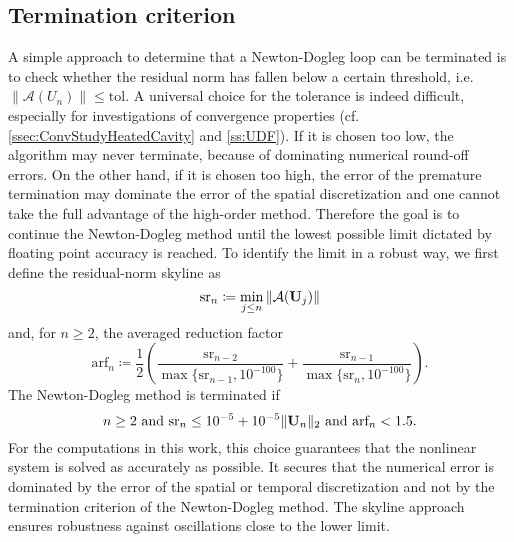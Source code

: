 \subsection{Termination criterion}
\label{ssec:TerminationCriterion}
A simple approach to determine that a Newton-Dogleg loop can be terminated
is to check whether the residual norm has fallen below a certain threshold, i.e.
$ \| \mathcal{A}(U_n) \| \leq \textrm{tol}  $.
A universal choice for the tolerance is indeed difficult,
especially for investigations of convergence properties (cf.  \cref{ssec:ConvStudyHeatedCavity} and \cref{ss:UDF}).
If it is chosen too low, the algorithm may never terminate, because of dominating numerical round-off errors. On the other hand, if it is chosen too high, the error of the premature termination may dominate  the error of
the spatial discretization and one cannot take the full advantage of the high-order method.
Therefore the goal is to continue the Newton-Dogleg method until
the lowest possible limit dictated by floating point accuracy is reached.
To identify the limit in a robust way, we first define the residual-norm skyline as
\begin{equation}
	\textrm{sr}_n \coloneqq \min_{j \leq n} \| \mathcal{A}(\textbf{U}_j) \|
\end{equation}
and, for $n \geq 2$, the averaged reduction factor
\begin{equation}
	\textrm{arf}_n \coloneqq \frac{1}{2} \left(
	\frac{ \textrm{sr}_{n-2} }{  \max \{ \textrm{sr}_{n-1}, 10^{-100} \} }
	+  \frac{ \textrm{sr}_{n-1} }{  \max \{ \textrm{sr}_{n},   10^{-100} \} }
	\right) .
\end{equation}
The Newton-Dogleg method is terminated if
\begin{equation}
	n \geq 2 \text{ and }
	\textrm{sr}_n \leq 10^{-5} + 10^{-5} \| \textbf{U}_n \|_2 \text{ and }
	\textrm{arf}_n < 1.5 .
\end{equation}
For the computations in this work, this choice guarantees that the
nonlinear system is solved as accurately as possible. It secures that the numerical error is dominated by the error of the spatial or temporal discretization
and not by the termination criterion of the Newton-Dogleg method.
The skyline approach ensures robustness against oscillations close to the lower limit.
